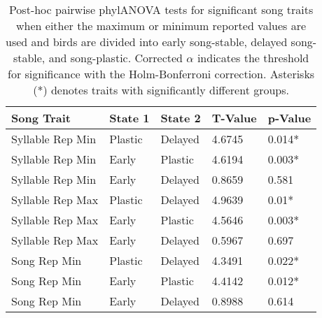 \documentclass[a4paper,12pt]{article}
\begin{document}
\begin{table}[ht]
\caption{Post-hoc pairwise phylANOVA tests for significant song traits when either the maximum or minimum reported values are used and birds are divided into early song-stable, delayed song-stable, and song-plastic. Corrected $\alpha$ indicates the threshold for significance with the Holm-Bonferroni correction. Asterisks (*) denotes traits with significantly different groups.}
\centering
\begin{tabular}{lllll}
  \hline
Song Trait & State 1 & State 2 & T-Value & p-Value \\ 
  \hline
Syllable Rep Min & Plastic & Delayed & 4.6745 & 0.014* \\ 
  Syllable Rep Min & Early & Plastic & 4.6194 & 0.003* \\ 
  Syllable Rep Min & Early & Delayed & 0.8659 & 0.581 \\ \hdashline
  Syllable Rep Max & Plastic & Delayed & 4.9639 & 0.01* \\ 
  Syllable Rep Max & Early & Plastic & 4.5646 & 0.003* \\ 
  Syllable Rep Max & Early & Delayed & 0.5967 & 0.697 \\ \hdashline
  Song Rep Min & Plastic & Delayed & 4.3491 & 0.022* \\ 
  Song Rep Min & Early & Plastic & 4.4142 & 0.012* \\ 
  Song Rep Min & Early & Delayed & 0.8988 & 0.614 \\ 
   \hline
\end{tabular}
\end{table}
\end{document}
